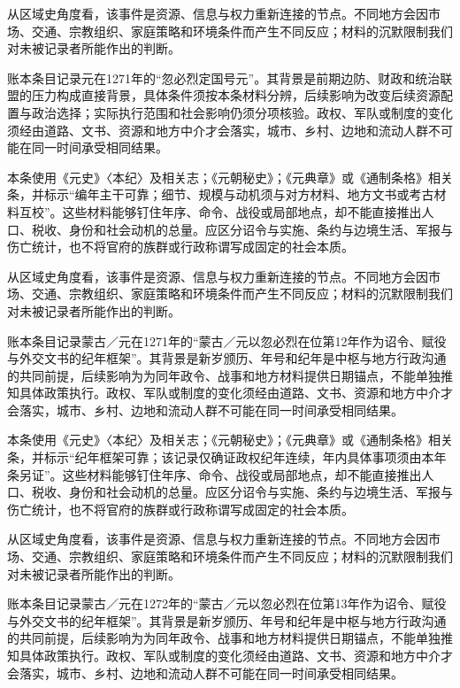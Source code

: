 从区域史角度看，该事件是资源、信息与权力重新连接的节点。不同地方会因市场、交通、宗教组织、家庭策略和环境条件而产生不同反应；材料的沉默限制我们对未被记录者所能作出的判断。

账本条目记录元在1271年的“忽必烈定国号元”。其背景是前期边防、财政和统治联盟的压力构成直接背景，具体条件须按本条材料分辨，后续影响为改变后续资源配置与政治选择；实际执行范围和社会影响仍须分项核验。政权、军队或制度的变化须经由道路、文书、资源和地方中介才会落实，城市、乡村、边地和流动人群不可能在同一时间承受相同结果。

本条使用《元史》〈本纪〉及相关志；《元朝秘史》；《元典章》或《通制条格》相关条，并标示“编年主干可靠；细节、规模与动机须与对方材料、地方文书或考古材料互校”。这些材料能够钉住年序、命令、战役或局部地点，却不能直接推出人口、税收、身份和社会动机的总量。应区分诏令与实施、条约与边境生活、军报与伤亡统计，也不将官府的族群或行政称谓写成固定的社会本质。

从区域史角度看，该事件是资源、信息与权力重新连接的节点。不同地方会因市场、交通、宗教组织、家庭策略和环境条件而产生不同反应；材料的沉默限制我们对未被记录者所能作出的判断。

账本条目记录蒙古／元在1271年的“蒙古／元以忽必烈在位第12年作为诏令、赋役与外交文书的纪年框架”。其背景是新岁颁历、年号和纪年是中枢与地方行政沟通的共同前提，后续影响为为同年政令、战事和地方材料提供日期锚点，不能单独推知具体政策执行。政权、军队或制度的变化须经由道路、文书、资源和地方中介才会落实，城市、乡村、边地和流动人群不可能在同一时间承受相同结果。

本条使用《元史》〈本纪〉及相关志；《元朝秘史》；《元典章》或《通制条格》相关条，并标示“纪年框架可靠；该记录仅确证政权纪年连续，年内具体事项须由本年条另证”。这些材料能够钉住年序、命令、战役或局部地点，却不能直接推出人口、税收、身份和社会动机的总量。应区分诏令与实施、条约与边境生活、军报与伤亡统计，也不将官府的族群或行政称谓写成固定的社会本质。

从区域史角度看，该事件是资源、信息与权力重新连接的节点。不同地方会因市场、交通、宗教组织、家庭策略和环境条件而产生不同反应；材料的沉默限制我们对未被记录者所能作出的判断。

账本条目记录蒙古／元在1272年的“蒙古／元以忽必烈在位第13年作为诏令、赋役与外交文书的纪年框架”。其背景是新岁颁历、年号和纪年是中枢与地方行政沟通的共同前提，后续影响为为同年政令、战事和地方材料提供日期锚点，不能单独推知具体政策执行。政权、军队或制度的变化须经由道路、文书、资源和地方中介才会落实，城市、乡村、边地和流动人群不可能在同一时间承受相同结果。

